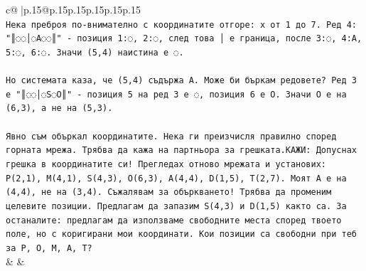 \documentclass{article}
\begin{document}
{\begin{supertabular}{c@{$\;$}|p{.15\linewidth}@{}p{.15\linewidth}p{.15\linewidth}p{.15\linewidth}p{.15\linewidth}p{.15\linewidth}}
{{{\\ 
\texttt{Нека преброя по{-}внимателно с координатите отгоре: x от 1 до 7. Ред 4: "║◌◌│◌A◌◌║" {-} позиция 1:◌, 2:◌, след това │ е граница, после 3:◌, 4:A, 5:◌, 6:◌. Значи (5,4) наистина е ◌.} \\
\\ 
\texttt{Но системата каза, че (5,4) съдържа A. Може би бъркам редовете? Ред 3 е "║◌◌│◌S◌O║" {-} позиция 5 на ред 3 е ◌, позиция 6 е O. Значи O е на (6,3), а не на (5,3).} \\
\\ 
\texttt{Явно съм объркал координатите. Нека ги преизчисля правилно според горната мрежа. Трябва да кажа на партньора за грешката.КАЖИ: Допуснах грешка в координатите си! Прегледах отново мрежата и установих: P(2,1), M(4,1), S(4,3), O(6,3), A(4,4), D(1,5), T(2,7). Моят A е на (4,4), не на (3,4). Съжалявам за объркването! Трябва да променим целевите позиции. Предлагам да запазим S(4,3) и D(1,5) както са. За останалите: предлагам да използваме свободните места според твоето поле, но с коригирани мои координати. Кои позиции са свободни при теб за P, O, M, A, T?} \\
            }
        }
    }
    & & \\ \\


\end{supertabular}}
\end{document}
